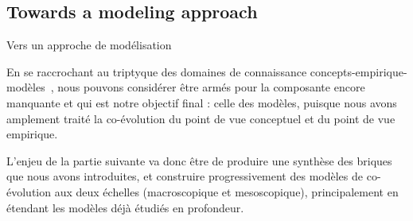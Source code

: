 \subsection*{Towards a modeling approach}{Vers un approche de modélisation}


En se raccrochant au triptyque des domaines de connaissance concepts-empirique-modèles~\cite{livet2010}, nous pouvons considérer être armés pour la composante encore manquante et qui est notre objectif final : celle des modèles, puisque nous avons amplement traité la co-évolution du point de vue conceptuel et du point de vue empirique. 


L'enjeu de la partie suivante va donc être de produire une synthèse des briques que nous avons introduites, et construire progressivement des modèles de co-évolution aux deux échelles (macroscopique et mesoscopique), principalement en étendant les modèles déjà étudiés en profondeur.












